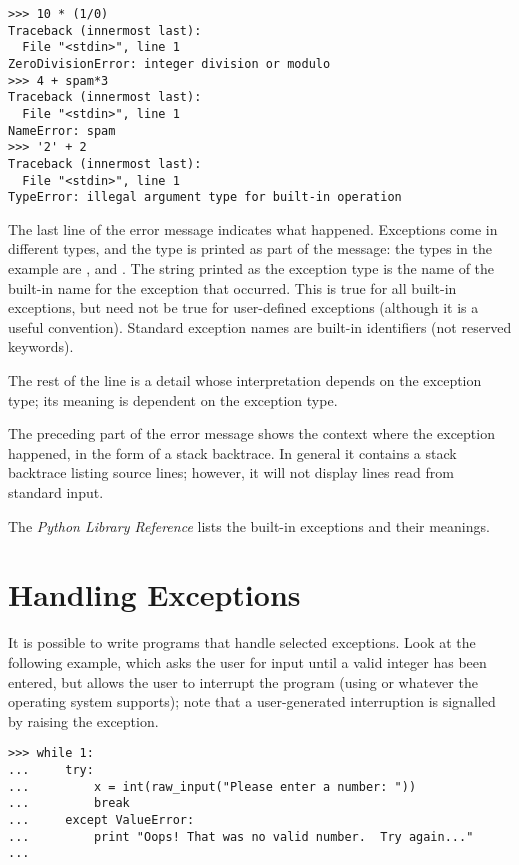 \documentclass{manual}
\begin{document}
\begin{verbatim}
>>> 10 * (1/0)
Traceback (innermost last):
  File "<stdin>", line 1
ZeroDivisionError: integer division or modulo
>>> 4 + spam*3
Traceback (innermost last):
  File "<stdin>", line 1
NameError: spam
>>> '2' + 2
Traceback (innermost last):
  File "<stdin>", line 1
TypeError: illegal argument type for built-in operation
\end{verbatim}

The last line of the error message indicates what happened.
Exceptions come in different types, and the type is printed as part of
the message: the types in the example are
,  and
.
The string printed as the exception type is the name of the built-in
name for the exception that occurred.  This is true for all built-in
exceptions, but need not be true for user-defined exceptions (although
it is a useful convention).
Standard exception names are built-in identifiers (not reserved
keywords).

The rest of the line is a detail whose interpretation depends on the
exception type; its meaning is dependent on the exception type.

The preceding part of the error message shows the context where the
exception happened, in the form of a stack backtrace.
In general it contains a stack backtrace listing source lines; however,
it will not display lines read from standard input.

The \emph{Python Library Reference} lists the built-in exceptions and
their meanings.


\section{Handling Exceptions \label{handling}}

It is possible to write programs that handle selected exceptions.
Look at the following example, which asks the user for input until a
valid integer has been entered, but allows the user to interrupt the
program (using  or whatever the operating system
supports); note that a user-generated interruption is signalled by
raising the  exception.

\begin{verbatim}
>>> while 1:
...     try:
...         x = int(raw_input("Please enter a number: "))
...         break
...     except ValueError:
...         print "Oops! That was no valid number.  Try again..."
...     
\end{verbatim}
\end{document}
